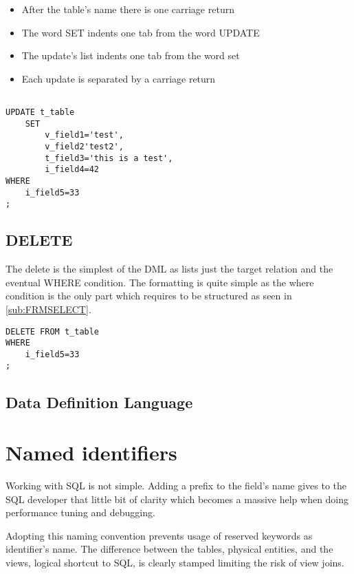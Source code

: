 \begin{itemize}
 \item After the table's name there is one carriage return
 \item The word SET indents one tab from the word UPDATE
 \item The update's list indents one tab from the word set
 \item Each update is separated by a carriage return
\end{itemize}


\begin{lstlisting}[style=pgsql]

UPDATE t_table
	SET
		v_field1='test',
		v_field2'test2',
		t_field3='this is a test',
		i_field4=42
WHERE
	i_field5=33
;

\end{lstlisting}



\subsection{DELETE}
The delete is the simplest of the DML as lists just the target relation and the eventual WHERE condition.
The formatting is quite simple as the where condition is the only part which requires to be structured as seen in 
\ref{sub:FRMSELECT}.

\begin{lstlisting}[style=pgsql]
DELETE FROM t_table
WHERE
	i_field5=33
;
\end{lstlisting}




\subsection{Data Definition Language}

\section{Named identifiers}
Working with SQL is not simple.  Adding a prefix to the field's name gives to the SQL developer that little bit of 
clarity which becomes a massive help when doing performance tuning and debugging.\newline 

Adopting this naming convention prevents usage of reserved keywords as identifier's name. The difference between the 
tables, physical entities, and the views, logical shortcut to SQL, is clearly stamped limiting the risk of view joins. 
\newline



